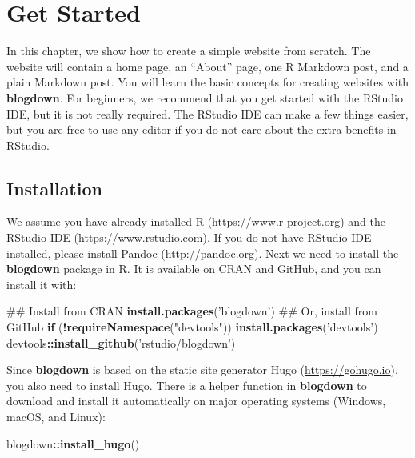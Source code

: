 \documentclass[12pt,]{krantz}
\makeatletter
\newenvironment{Shaded}{\begin{snugshade}}{\end{snugshade}}
\newcommand{\KeywordTok}[1]{\textcolor[rgb]{0.13,0.29,0.53}{\textbf{#1}}}
\newcommand{\StringTok}[1]{\textcolor[rgb]{0.31,0.60,0.02}{#1}}
\newcommand{\ControlFlowTok}[1]{\textcolor[rgb]{0.13,0.29,0.53}{\textbf{#1}}}
\newcommand{\OperatorTok}[1]{\textcolor[rgb]{0.81,0.36,0.00}{\textbf{#1}}}
\newcommand{\NormalTok}[1]{#1}
\newenvironment{kframe}{%
\medskip{}
\setlength{\fboxsep}{.8em}
 \def\at@end@of@kframe{}%
 \ifinner\ifhmode%
  \def\at@end@of@kframe{\end{minipage}}%
  \begin{minipage}{\columnwidth}%
 \fi\fi%
 \def\FrameCommand##1{\hskip\@totalleftmargin \hskip-\fboxsep
 \colorbox{shadecolor}{##1}\hskip-\fboxsep
     \hskip-\linewidth \hskip-\@totalleftmargin \hskip\columnwidth}%
 \MakeFramed {\advance\hsize-\width
   \@totalleftmargin\z@ \linewidth\hsize
   \@setminipage}}%
 {\par\unskip\endMakeFramed%
 \at@end@of@kframe}
\renewenvironment{Shaded}{\begin{kframe}}{\end{kframe}}
\theoremstyle{definition}
\theoremstyle{definition}
\theoremstyle{definition}
\theoremstyle{remark}
\makeatother
\begin{document}
\mainmatter

\chapter{Get Started}\label{get-started}

In this chapter, we show how to create a simple website from scratch.
The website will contain a home page, an ``About'' page, one R Markdown
post, and a plain Markdown post. You will learn the basic concepts for
creating websites with \textbf{blogdown}. For beginners, we recommend
that you get started with the RStudio IDE, but it is not really
required. The RStudio IDE can make a few things easier, but you are free
to use any editor if you do not care about the extra benefits in
RStudio.

\section{Installation}\label{installation}

We assume you have already installed R (\url{https://www.r-project.org})
\citep{R-base} and the RStudio IDE (\url{https://www.rstudio.com}). If
you do not have RStudio IDE installed, please install
Pandoc (\url{http://pandoc.org}). Next we need to install
the \textbf{blogdown} package in R. It is available on CRAN and GitHub,
and you can install it with:

\begin{Shaded}
\begin{Highlighting}[]
\NormalTok{## Install from CRAN}
\KeywordTok{install.packages}\NormalTok{(}\StringTok{'blogdown'}\NormalTok{) }
\NormalTok{## Or, install from GitHub}
\ControlFlowTok{if}\NormalTok{ (}\OperatorTok{!}\KeywordTok{requireNamespace}\NormalTok{(}\StringTok{"devtools"}\NormalTok{)) }\KeywordTok{install.packages}\NormalTok{(}\StringTok{'devtools'}\NormalTok{)}
\NormalTok{devtools}\OperatorTok{::}\KeywordTok{install_github}\NormalTok{(}\StringTok{'rstudio/blogdown'}\NormalTok{)}
\end{Highlighting}
\end{Shaded}

Since \textbf{blogdown} is based on the static site generator Hugo
(\url{https://gohugo.io}), you also need to install Hugo.
There is a helper function in \textbf{blogdown} to download and install
it automatically on major operating systems (Windows, macOS, and Linux):

\begin{Shaded}
\begin{Highlighting}[]
\NormalTok{blogdown}\OperatorTok{::}\KeywordTok{install_hugo}\NormalTok{()}
\end{Highlighting}
\end{Shaded}
\end{document}
